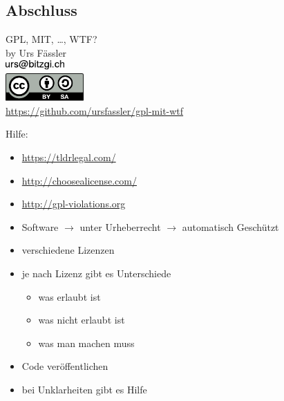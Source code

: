 
\subsection{Abschluss}
\label{sec:zusammenfassung}
\subsectionframe

\begin{frame}
	\begin{center}
		{\large GPL, MIT, \ldots, WTF?}\\
		\vspace{0.5em}
		by Urs Fässler\\
		\includegraphics[width=2.25cm]{res/mail.pdf}\\
		\pause
		\vspace{0.5em}
		\includegraphics[width=3cm]{res/cc-by-sa.pdf}\\
		\pause
		\vspace{1em}
		\url{https://github.com/ursfassler/gpl-mit-wtf}\\
	\end{center}

	\pause
	Hilfe:
	\begin{itemize}
		\pause
		\item \url{https://tldrlegal.com/}
		\pause
		\item \url{http://choosealicense.com/}
		\pause
		\item \url{http://gpl-violations.org}
	\end{itemize}
\end{frame}
\note
{
	\begin{itemize}
		\item Software $\rightarrow$ unter Urheberrecht $\rightarrow$ automatisch Geschützt
		\item verschiedene Lizenzen
		\item je nach Lizenz gibt es Unterschiede
		\begin{itemize}
			\item was erlaubt ist
			\item was nicht erlaubt ist
			\item was man machen muss
		\end{itemize}
		\item Code veröffentlichen
		\item bei Unklarheiten gibt es Hilfe
	\end{itemize}
}
